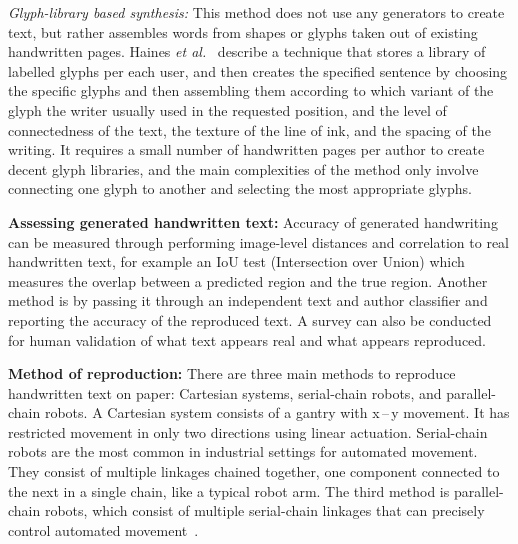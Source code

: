 \emph{Glyph-library based synthesis:} This method does not use any generators to create text, but rather assembles words from shapes or glyphs taken out of existing handwritten pages. Haines \emph{et al.}~\cite[p.~26:1]{haines2016} describe a technique that stores a library of labelled glyphs per each user, and then creates the specified sentence by choosing the specific glyphs and then assembling them according to which variant of the glyph the writer usually used in the requested position, and the level of connectedness of the text, the texture of the line of ink, and the spacing of the writing. It requires a small number of handwritten pages per author to create decent glyph libraries, and the main complexities of the method only involve connecting one glyph to another and selecting the most appropriate glyphs.

\textbf{Assessing generated handwritten text:} Accuracy of generated handwriting can be measured through performing image-level distances and correlation to real handwritten text, for example an IoU test (Intersection over Union) which measures the overlap between a predicted region and the true region. Another method is by passing it through an independent text and author classifier and reporting the accuracy of the reproduced text. A survey can also be conducted for human validation of what text appears real and what appears reproduced.

\textbf{Method of reproduction:} There are three main methods to reproduce handwritten text on paper: Cartesian systems, serial-chain robots, and parallel-chain robots. A Cartesian system consists of a gantry with x\,--\,y movement. It has restricted movement in only two directions using linear actuation. Serial-chain robots are the most common in industrial settings for automated movement. They consist of multiple linkages chained together, one component connected to the next in a single chain, like a typical robot arm. The third method is parallel-chain robots, which consist of multiple serial-chain linkages that can precisely control automated movement~\cite{teikari2016}.

